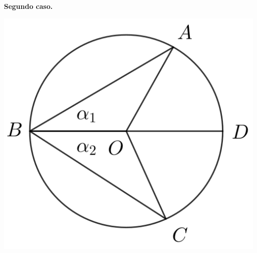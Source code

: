 \documentclass[12pt,a4paper, oneside]{book}
\begin{document}
\textbf{Segundo caso.}
\begin{center}
\includegraphics[scale=0.6]{Imagenes/circulo 1.png} 
\end{center} 
\end{document}
